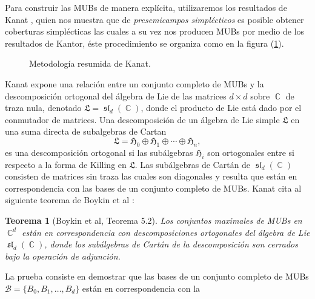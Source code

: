 \documentclass[a4paper]{report}
\DeclareMathOperator{\C}{\mathbb{C}}
\DeclareMathOperator{\Sl}{\mathfrak{sl}}
\newtheorem{theorem}{Teorema}
\begin{document}
  Para construir las MUBs de manera explícita, utilizaremos
  los resultados de Kanat \cite{abdukhalikov2015}, quien nos
  muestra que de \textit{presemicampos simplécticos} es
  posible obtener coberturas simplécticas las cuales a su vez
  nos producen MUBs por medio de los resultados de Kantor,
  éste procedimiento se organiza como en la figura
  (\ref{diag:kanat}). 
  \begin{figure}[h]
    \centering
    \caption{Metodología resumida de Kanat.}
    \label{diag:kanat}
  \end{figure}
  Kanat expone una relación entre un conjunto completo de
  MUBs y la descomposición ortogonal del álgebra de Lie de
  las matrices $d \times d$ sobre $\C$ de traza nula,
  denotado $\mathfrak{L} = \Sl_d(\C)$, donde el producto de
  Lie está dado por el conmutador de matrices. Una
  descomposición de un álgebra de Lie simple $\mathfrak{L}$
  en una suma directa de subalgebras de Cartan
  \begin{equation}
    \mathfrak{L}
    = \mathfrak{H}_0 \oplus \mathfrak{H}_1 \oplus \cdots
    \oplus \mathfrak{H}_n,
  \end{equation}
  es una descomposición ortogonal si las subálgebras
  $\mathfrak{H}_i$ son ortogonales entre si respecto a la
  forma de Killing en $\mathfrak{L}$.  Las subálgebras de
  Cartán de $\Sl_d(\C)$ consisten de matrices sin traza las
  cuales son diagonales y resulta que están en
  correspondencia con las bases de un conjunto completo de
  MUBs. Kanat cita al siguiente teorema de Boykin et al
  \cite{boykin2005}:
  \begin{theorem}[Boykin et al, Teorema 5.2]
    \label{thm:boykin}
    Los conjuntos maximales de MUBs en $\C^{d}$ están en
    correspondencia con descomposiciones ortogonales del
    álgebra de Lie $\Sl_d(\C)$, donde los subálgebras de
    Cartán de la descomposición son cerrados bajo la
    operación de adjunción.
  \end{theorem}
  La prueba consiste en demostrar que las bases de un
  conjunto completo de MUBs $\mathcal B =
  \{B_0,B_1,\ldots,B_d\}$ están en correspondencia con la
\end{document}
